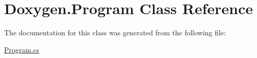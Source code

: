 \hypertarget{class_doxygen_1_1_program}{\section{Doxygen.\+Program Class Reference}
\label{class_doxygen_1_1_program}
}


The documentation for this class was generated from the following file\+:\begin{DoxyCompactItemize}
\item 
\hyperlink{_program_8cs}{Program.\+cs}\end{DoxyCompactItemize}

